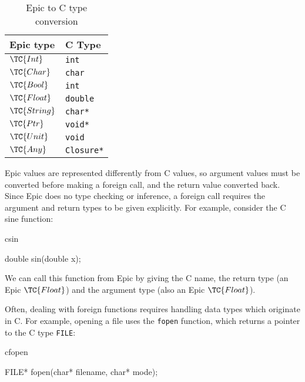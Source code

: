 \begin{table}
\begin{center}
\begin{tabular}{|l|l|}
\hline
Epic type & C Type \\
\hline
$\TC{Int}$  & \texttt{int} \\
$\TC{Char}$ & \texttt{char} \\
$\TC{Bool}$ & \texttt{int} \\
$\TC{Float}$ & \texttt{double} \\
$\TC{String}$ & \texttt{char*} \\
$\TC{Ptr}$ & \texttt{void*} \\
$\TC{Unit}$ & \texttt{void} \\
$\TC{Any}$ & \texttt{Closure*} \\
\hline
\end{tabular}
\end{center}
\caption{Epic to C type conversion}
\label{epicctypes}
\end{table}

Epic values are represented differently from C values, so argument
values must be converted before making a foreign call, and the return
value converted back. Since Epic does no type checking or inference,
a foreign call requires the argument and return types to be given
explicitly. For example, consider the C sine function:

\begin{SaveVerbatim}{csin}

double sin(double x);

\end{SaveVerbatim}

\noindent
We can call this function from Epic by giving the C name, the return
type (an Epic $\TC{Float}$) and the argument type (also an Epic
$\TC{Float}$).


\noindent
Often, dealing with foreign functions requires handling data types
which originate in C. For example, opening a file uses the
\texttt{fopen} function, which returns a pointer to the C type
\texttt{FILE}:

\begin{SaveVerbatim}{cfopen}

FILE* fopen(char* filename, char* mode); 

\end{SaveVerbatim}

